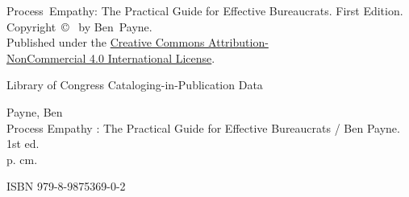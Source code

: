 \thispagestyle{empty}

\noindent Process~Empathy: The Practical Guide for Effective Bureaucrats. First Edition. \\Copyright~\copyright~\the\year{}
 by Ben~Payne. \\
Published under the \href{https://creativecommons.org/licenses/by-nc/4.0/}{Creative Commons Attribution-\\NonCommercial 4.0 International License}.


\vspace*{\fill}



\noindent Library of Congress Cataloging-in-Publication Data

\noindent Payne, Ben\\
Process Empathy : The Practical Guide for Effective Bureaucrats / Ben Payne. 1st ed.\\
p. cm.

\noindent ISBN 979-8-9875369-0-2
